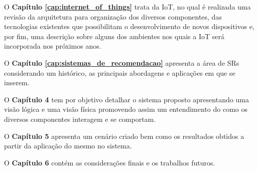 O \textbf{Capítulo \ref{cap:internet_of_things}} trata da IoT, no qual é realizada uma revisão da arquitetura para organização dos diversos componentes, das tecnologias existentes que possibilitam o desenvolvimento de novos dispositivos e, por fim, uma descrição sobre alguns dos ambientes nos quais a IoT será incorporada nos próximos anos.

O \textbf{Capítulo \ref{cap:sistemas_de_recomendacao}} apresenta a área de SRs considerando um histórico, as principais abordagens e aplicações em que se inserem.  

O \textbf{Capítulo 4} tem por objetivo detalhar o sistema proposto apresentando uma visão lógica e uma visão física promovendo assim um entendimento do como os diversos componentes interagem e se comportam.

O \textbf{Capítulo 5} apresenta um cenário criado bem como os resultados obtidos a partir da aplicação do mesmo no sistema.

O \textbf{Capítulo 6} contém as considerações finais e os trabalhos futuros.

	

